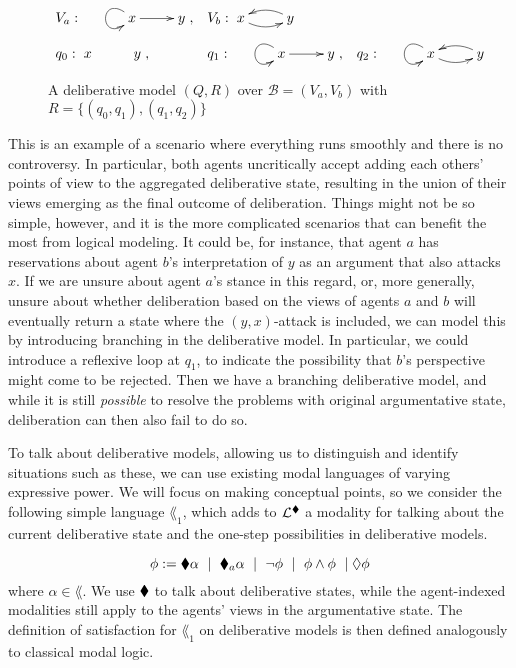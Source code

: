 \documentclass[greybox]{svmult}
\newcommand{\views}{\mathcal B}
\begin{document}
\begin{figure}
$\begin{array}{llllll}
V_a: \xymatrix{& x \ar[r] \ar@(lu,ld) & y}, & V_b: \xymatrix{x \ar@/_/[r] & y \ar@/_/[l] } \\ \\
q_0: \xymatrix{ x & y }, & q_1: \xymatrix{& x \ar@(lu,ld)  \ar[r] & y }, & q_2: \xymatrix{&  x \ar@(lu,ld)  \ar@/_/[r] & y \ar@/_/[l]}
\end{array}$
\caption{A deliberative model $(Q,R)$ over $\views = (V_a,V_b)$ with $R = \{(q_0,q_1),(q_1,q_2)\}$}
\label{fig:del1}
\end{figure}

This is an example of a scenario where everything runs smoothly and there is no controversy. In particular, both agents uncritically accept adding each others' points of view to the aggregated deliberative state, resulting in the union of their views emerging as the final outcome of deliberation. Things might not be so simple, however, and it is the more complicated scenarios that can benefit the most from logical modeling. It could be, for instance, that agent $a$ has reservations about agent $b$'s interpretation of $y$ as an argument that also attacks $x$. If we are unsure about agent $a$'s stance in this regard, or, more generally, unsure about whether deliberation based on the views of agents $a$ and $b$ will eventually return a state where the $(y,x)$-attack is included, we can model this by introducing branching in the deliberative model. In particular, we could introduce a reflexive loop at $q_1$, to indicate the possibility that $b$'s perspective might come to be rejected. Then we have a branching deliberative model, and while it is still \emph{possible} to resolve the problems with original argumentative state, deliberation can then also fail to do so. 

To talk about deliberative models, allowing us to distinguish and identify situations such as these, we can use existing modal languages of varying expressive power. We will focus on making conceptual points, so we consider the following simple language $\lang_1$, which adds to $\mathcal L^{\blacklozenge}$ a modality for talking about the current deliberative state and the one-step possibilities in deliberative models.

$$
\phi := \blacklozenge \alpha \ \mid \ \blacklozenge_a \alpha \ \mid \ \neg \phi \ \mid \ \phi \land \phi \ \mid \lozenge \phi
$$
where $\alpha \in \lang$. We use $\blacklozenge$ to talk about deliberative states, while the agent-indexed modalities still apply to the agents' views in the argumentative state. The definition of satisfaction for $\lang_1$ on deliberative models is then defined analogously to classical modal logic.
\end{document}
